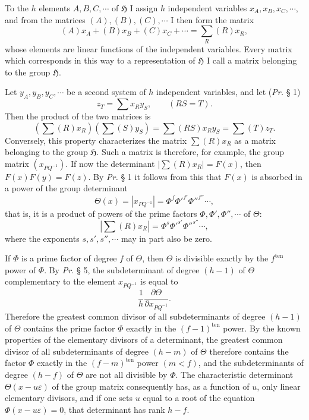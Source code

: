 \documentclass[11pt]{article}
\newcommand{\Hgrp}{\mathfrak{H}}
\newcommand{\eps}{\varepsilon}
\newcommand{\ten}{\mathrm{ten}}
\begin{document}
To the $h$ elements $A,B,C,\cdots$ of $\Hgrp$ I assign $h$ independent variables $x_A,x_B,x_C,\cdots$, and from the matrices $(A),(B),(C),\cdots$ I then form the matrix
\[
(A)x_A+(B)x_B+(C)x_C+\cdots=\sum_R(R)x_R,
\]
whose elements are linear functions of the independent variables. Every matrix which corresponds in this way to a representation of $\Hgrp$ I call a matrix belonging to the group $\Hgrp$.

Let $y_A,y_B,y_C,\cdots$ be a second system of $h$ independent variables, and let (\emph{Pr.} § 1)
\begin{equation}\tag{1.}
z_T=\sum x_Ry_S,\qquad (RS=T).
\end{equation}
Then the product of the two matrices is
\begin{equation}\tag{2.}
\left(\sum(R)x_R\right)\left(\sum(S)y_S\right)=\sum(RS)x_Ry_S=\sum(T)z_T.
\end{equation}
Conversely, this property characterizes the matrix $\sum(R)x_R$ as a matrix belonging to the group $\Hgrp$. Such a matrix is therefore, for example, the group matrix $(x_{PQ^{-1}})$. If now the determinant $\left|\sum(R)x_R\right|=F(x)$, then $F(x)F(y)=F(z)$. By \emph{Pr.} § 1 it follows from this that $F(x)$ is absorbed in a power of the group determinant
\[
\Theta(x)=\left|x_{PQ^{-1}}\right|=\Phi^f{\Phi'}^{f'}{\Phi''}^{f''}\cdots,
\]
that is, it is a product of powers of the prime factors $\Phi,\Phi',\Phi'',\cdots$ of $\Theta$:
\begin{equation}\tag{3.}
\left|\sum(R)x_R\right|=\Phi^s{\Phi'}^{s'}{\Phi''}^{s''}\cdots,
\end{equation}
where the exponents $s,s',s'',\cdots$ may in part also be zero.

If $\Phi$ is a prime factor of degree $f$ of $\Theta$, then $\Theta$ is divisible exactly by the $f^{\ten}$ power of $\Phi$. By \emph{Pr.} § 5, the subdeterminant of degree $(h-1)$ of $\Theta$ complementary to the element $x_{PQ^{-1}}$ is equal to
\[
\frac1h\frac{\partial\Theta}{\partial x_{PQ^{-1}}}.
\]
Therefore the greatest common divisor of all subdeterminants of degree $(h-1)$ of $\Theta$ contains the prime factor $\Phi$ exactly in the $(f-1)^{\ten}$ power. By the known properties of the elementary divisors of a determinant, the greatest common divisor of all subdeterminants of degree $(h-m)$ of $\Theta$ therefore contains the factor $\Phi$ exactly in the $(f-m)^{\ten}$ power $(m<f)$, and the subdeterminants of degree $(h-f)$ of $\Theta$ are not all divisible by $\Phi$. The characteristic determinant $\Theta(x-u\eps)$ of the group matrix consequently has, as a function of $u$, only linear elementary divisors, and if one sets $u$ equal to a root of the equation $\Phi(x-u\eps)=0$, that determinant has rank $h-f$.
\end{document}
